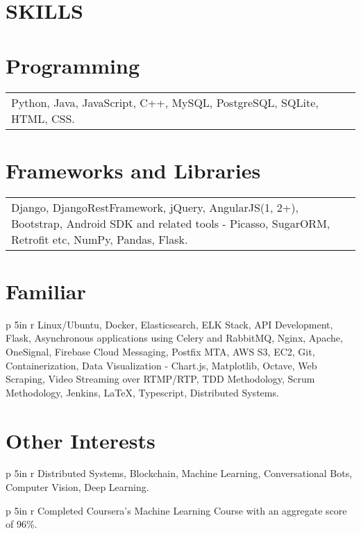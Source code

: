 \documentclass[margin]{res}
\begin{document}
\begin{resume}
\section{SKILLS} 
\normalsize{\section{Programming}}
                 \begin{tabular}{p{5in} r}
                 Python, Java, JavaScript, C++, MySQL, PostgreSQL, SQLite, HTML, CSS.
                 \end{tabular}
\normalsize{\section{Frameworks and Libraries}} 
                 \begin{tabular}{p{5in} r}
                  Django, DjangoRestFramework, jQuery, AngularJS(1, 2+), Bootstrap, Android SDK and related tools - Picasso, SugarORM, Retrofit etc, NumPy, Pandas, Flask.
                  \end{tabular}
\normalsize{\section{Familiar}}
	           \begin{tabular}{p {5in} r}
                   Linux/Ubuntu, Docker, Elasticsearch, ELK Stack, API Development, Flask, Asynchronous applications using Celery and RabbitMQ, Nginx, Apache, OneSignal, Firebase Cloud Messaging, Postfix MTA, AWS S3, EC2, Git, Containerization, Data Visualization - Chart.js, Matplotlib, Octave, Web Scraping, Video Streaming over RTMP/RTP, TDD Methodology, Scrum Methodology, Jenkins, LaTeX, Typescript, Distributed Systems.
                   \end{tabular}
\normalsize{\section{Other Interests}}
               \begin{tabular}{p {5in} r}
                   Distributed Systems, Blockchain, Machine Learning, Conversational Bots, Computer Vision, Deep Learning.
                   \end{tabular}
               \linebreak
                \begin{tabular}{p {5in} r}
                    Completed Coursera's Machine Learning Course with an aggregate score of 96\%.

\end{tabular}
\end{resume}
\end{document}
